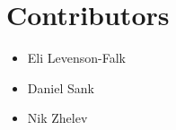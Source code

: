 \chapter*{Contributors}

\begin{itemize}[label={}]
  \item Eli Levenson-Falk
  \item Daniel Sank
  \item Nik Zhelev
\end{itemize}

